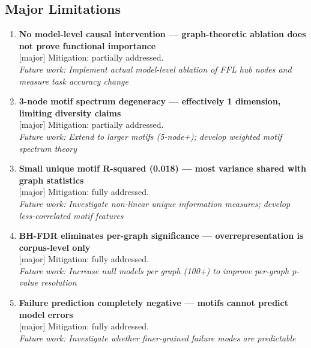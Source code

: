 \documentclass[11pt,a4paper]{article}
\begin{document}
\subsection{Major Limitations}
\begin{enumerate}[leftmargin=*]
\item \textbf{No model-level causal intervention — graph-theoretic ablation does not prove functional importance} \\\textcolor{majororange}{[major]} Mitigation: partially addressed. \\\textit{Future work: Implement actual model-level ablation of FFL hub nodes and measure task accuracy change}
\item \textbf{3-node motif spectrum degeneracy — effectively 1 dimension, limiting diversity claims} \\\textcolor{majororange}{[major]} Mitigation: partially addressed. \\\textit{Future work: Extend to larger motifs (5-node+); develop weighted motif spectrum theory}
\item \textbf{Small unique motif R-squared (0.018) — most variance shared with graph statistics} \\\textcolor{majororange}{[major]} Mitigation: fully addressed. \\\textit{Future work: Investigate non-linear unique information measures; develop less-correlated motif features}
\item \textbf{BH-FDR eliminates per-graph significance — overrepresentation is corpus-level only} \\\textcolor{majororange}{[major]} Mitigation: fully addressed. \\\textit{Future work: Increase null models per graph (100+) to improve per-graph p-value resolution}
\item \textbf{Failure prediction completely negative — motifs cannot predict model errors} \\\textcolor{majororange}{[major]} Mitigation: fully addressed. \\\textit{Future work: Investigate whether finer-grained failure modes are predictable}
\end{enumerate}
\end{document}
